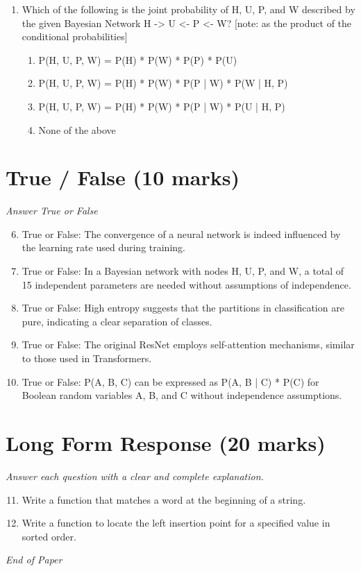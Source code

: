 \documentclass[12pt]{article}
\begin{document}
\begin{enumerate}[label=\arabic*.]
\begin{enumerate}[label=(\alph*)]
    \item False, False
    \item True, False
    \item False, True
\end{enumerate}
\item Which of the following is the joint probability of H, U, P, and W described by the given Bayesian Network H -\textgreater{} U \textless{}- P \textless{}- W? [note: as the product of the conditional probabilities]
\begin{enumerate}[label=(\alph*)]
    \item P(H, U, P, W) = P(H) * P(W) * P(P) * P(U)
    \item P(H, U, P, W) = P(H) * P(W) * P(P | W) * P(W | H, P)
    \item P(H, U, P, W) = P(H) * P(W) * P(P | W) * P(U | H, P)
    \item None of the above
\end{enumerate}
\end{enumerate}

\section*{True / False (10 marks)}
\textit{Answer True or False}
\begin{enumerate}[label=\arabic*.]
\setcounter{enumi}{5}
\item True or False: The convergence of a neural network is indeed influenced by the learning rate used during training.
\item True or False: In a Bayesian network with nodes H, U, P, and W, a total of 15 independent parameters are needed without assumptions of independence.
\item True or False: High entropy suggests that the partitions in classification are pure, indicating a clear separation of classes.
\item True or False: The original ResNet employs self-attention mechanisms, similar to those used in Transformers.
\item True or False: P(A, B, C) can be expressed as P(A, B | C) * P(C) for Boolean random variables A, B, and C without independence assumptions.
\end{enumerate}

\section*{Long Form Response (20 marks)}
\textit{Answer each question with a clear and complete explanation.}
\begin{enumerate}[label=\arabic*.]
\setcounter{enumi}{10}
\item Write a function that matches a word at the beginning of a string.
\item Write a function to locate the left insertion point for a specified value in sorted order.
\end{enumerate}

\vfill
\noindent\textit{End of Paper}
\end{document}
